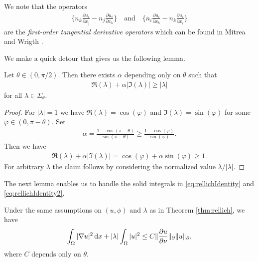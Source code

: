 We note that the operators
\begin{align*}
  \Big\{ n_k \frac{\partial u_i}{\partial x_j} - n_j \frac{\partial u_i}{\partial x_k} \Big\}
  \quad\text{and}\quad
  \Big\{ n_i \frac{\partial u_i}{\partial x_k} - n_k \frac{\partial u_i}{\partial x_i} \Big\}
\end{align*}
are the \emph{first-order tangential derivative operators} which can be found in Mitrea and Wrigth \cite{mitreaWright}.

We make a quick detour that gives us the following lemma.
\begin{lem}
  \label{lem:lambdaIneq}
  Let $\theta \in (0,\pi/2)$.
  Then there exists $\alpha$ depending only on $\theta$ such that
  \begin{align*}
    \Re(\lambda) + \alpha |\Im(\lambda)| \geq |\lambda|
  \end{align*}
  for all $\lambda \in \Sigma_\theta$.
\end{lem}

\begin{proof}
  For $|\lambda| = 1$ we have $\Re(\lambda) = \cos(\varphi)$ and $\Im(\lambda) = \sin(\varphi)$ for some $\varphi \in (0,\pi - \theta)$.
  Set
  \begin{align*}
    \alpha = \frac{1 - \cos(\pi - \theta)}{\sin(\pi - \theta)} \geq \frac{1 - \cos(\varphi)}{\sin(\varphi)}.
  \end{align*}
  Then we have
  \begin{align*}
    \Re(\lambda) + \alpha |\Im(\lambda)| = \cos(\varphi) + \alpha \sin(\varphi) \geq 1.
  \end{align*}
  For arbitrary $\lambda$ the claim follows by considering the normalized value $\lambda / |\lambda|$.
\end{proof}

The next lemma enables us to handle the solid integrals in \eqref{eq:rellichIdentity} and \eqref{eq:rellichIdentity2}.

\begin{lem}
  \label{lem:laxMilgramIneq}
  Under the same assumptions on $(u,\phi)$ and $\lambda$ as in Theorem \ref{thm:rellich}, we have
  \begin{align}
    \label{eq:laxMilgramIneq}
    \int_\Omega |\nabla u|^2 \, {\operatorname{d}\!{x}} + |\lambda| \int_\Omega |u|^2 \leq C \| \frac{\partial u}{\partial \nu} \|_\partial \|u\|_\partial,
  \end{align}
  where $C$ depends only on $\theta$.
\end{lem}

